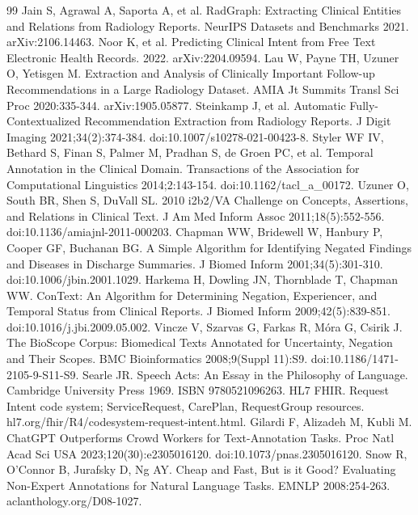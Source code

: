 \documentclass[3p,twocolumn]{elsarticle}
\begin{document}
\begin{thebibliography}{99}
\label{r12} Jain S, Agrawal A, Saporta A, et al. RadGraph: Extracting Clinical Entities and Relations from Radiology Reports. NeurIPS Datasets and Benchmarks 2021. arXiv:2106.14463.
\label{r13} Noor K, et al. Predicting Clinical Intent from Free Text Electronic Health Records. 2022. arXiv:2204.09594.
\label{r14} Lau W, Payne TH, Uzuner O, Yetisgen M. Extraction and Analysis of Clinically Important Follow-up Recommendations in a Large Radiology Dataset. AMIA Jt Summits Transl Sci Proc 2020:335-344. arXiv:1905.05877.
\label{r15} Steinkamp J, et al. Automatic Fully-Contextualized Recommendation Extraction from Radiology Reports. J Digit Imaging 2021;34(2):374-384. doi:10.1007/s10278-021-00423-8.
\label{r16} Styler WF IV, Bethard S, Finan S, Palmer M, Pradhan S, de Groen PC, et al. Temporal Annotation in the Clinical Domain. Transactions of the Association for Computational Linguistics 2014;2:143-154. doi:10.1162/tacl\_a\_00172.
\label{r17} Uzuner O, South BR, Shen S, DuVall SL. 2010 i2b2/VA Challenge on Concepts, Assertions, and Relations in Clinical Text. J Am Med Inform Assoc 2011;18(5):552-556. doi:10.1136/amiajnl-2011-000203.
\label{r18} Chapman WW, Bridewell W, Hanbury P, Cooper GF, Buchanan BG. A Simple Algorithm for Identifying Negated Findings and Diseases in Discharge Summaries. J Biomed Inform 2001;34(5):301-310. doi:10.1006/jbin.2001.1029.
\label{r19} Harkema H, Dowling JN, Thornblade T, Chapman WW. ConText: An Algorithm for Determining Negation, Experiencer, and Temporal Status from Clinical Reports. J Biomed Inform 2009;42(5):839-851. doi:10.1016/j.jbi.2009.05.002.
\label{r20} Vincze V, Szarvas G, Farkas R, Móra G, Csirik J. The BioScope Corpus: Biomedical Texts Annotated for Uncertainty, Negation and Their Scopes. BMC Bioinformatics 2008;9(Suppl 11):S9. doi:10.1186/1471-2105-9-S11-S9.
\label{r21} Searle JR. Speech Acts: An Essay in the Philosophy of Language. Cambridge University Press 1969. ISBN 9780521096263.
\label{r22} HL7 FHIR. Request Intent code system; ServiceRequest, CarePlan, RequestGroup resources. hl7.org/fhir/R4/codesystem-request-intent.html.
\label{r23} Gilardi F, Alizadeh M, Kubli M. ChatGPT Outperforms Crowd Workers for Text-Annotation Tasks. Proc Natl Acad Sci USA 2023;120(30):e2305016120. doi:10.1073/pnas.2305016120.
\label{r24} Snow R, O'Connor B, Jurafsky D, Ng AY. Cheap and Fast, But is it Good? Evaluating Non-Expert Annotations for Natural Language Tasks. EMNLP 2008:254-263. aclanthology.org/D08-1027.

\end{thebibliography}
\end{document}
